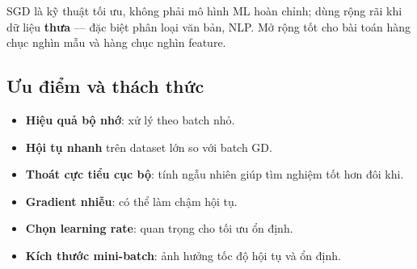 \begin{ynghia}[title={Ứng dụng SGD}]
SGD là kỹ thuật tối ưu, không phải mô hình ML hoàn chỉnh; dùng rộng rãi khi dữ liệu \textbf{thưa} --- đặc biệt phân loại văn bản, NLP.
Mở rộng tốt cho bài toán hàng chục nghìn mẫu và hàng chục nghìn feature.
\end{ynghia}

\subsection{Ưu điểm và thách thức}

\begin{tinhchat}[title={Ưu điểm}]
\begin{itemize}
  \item \textbf{Hiệu quả bộ nhớ}: xử lý theo batch nhỏ.
  \item \textbf{Hội tụ nhanh} trên dataset lớn so với batch GD.
  \item \textbf{Thoát cực tiểu cục bộ}: tính ngẫu nhiên giúp tìm nghiệm tốt hơn đôi khi.
\end{itemize}
\end{tinhchat}

\begin{luuy}[title={Thách thức}]
\begin{itemize}
  \item \textbf{Gradient nhiễu}: có thể làm chậm hội tụ.
  \item \textbf{Chọn learning rate}: quan trọng cho tối ưu ổn định.
  \item \textbf{Kích thước mini-batch}: ảnh hưởng tốc độ hội tụ và ổn định.
\end{itemize}
\end{luuy}
